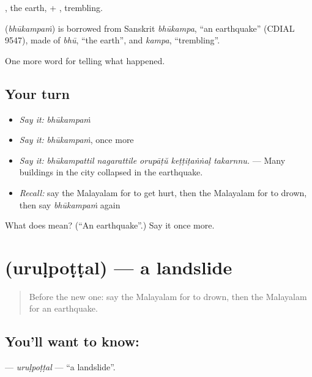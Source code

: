, the earth, + , trembling.

\begin{cousinweb}
\textbf{} (\emph{bhūkampaṁ}) is borrowed from Sanskrit \emph{bhūkampa}, \textquotedblleft{}an earthquake\textquotedblright{} (CDIAL 9547), made of \emph{bhū}, \textquotedblleft{}the earth\textquotedblright{}, and \emph{kampa}, \textquotedblleft{}trembling\textquotedblright{}.
\end{cousinweb}

\begin{grammarlens}[title={What you've built}]
One more word for telling what happened.
\end{grammarlens}

\subsection*{Your turn}
\begin{itemize}
\raggedright
  \item \emph{Say it:} \emph{bhūkampaṁ}
  \item \emph{Say it:} \emph{bhūkampaṁ}, once more
  \item \emph{Say it:} \emph{bhūkampattil nagarattile orupāṭŭ keṭṭiṭaṅṅaḷ takarnnu.} — Many buildings in the city collapsed in the earthquake.
  \item \emph{Recall:} say the Malayalam for to get hurt, then the Malayalam for to drown, then say \emph{bhūkampaṁ} again
\end{itemize}

\begin{tcolorbox}[breakable,colback=teal!4,colframe=teal!35!black,title={Before you move on}]
What does  mean? (\textquotedblleft{}An earthquake\textquotedblright{}.) Say it once more.
\end{tcolorbox}
\section[\texorpdfstring{\ml{ഉരുൾപൊട്ടൽ} (uruḷpoṭṭal)}{ഉരുൾപൊട്ടൽ (uruḷpoṭṭal)}]{ (uruḷpoṭṭal) — a landslide}

\label{lesson:ML-C377-urulpottal}



\begin{quote}
Before the new one: say the Malayalam for to drown, then the Malayalam for an earthquake.
\end{quote}

\subsection*{You'll want to know: }
\textbf{} — \emph{uruḷpoṭṭal} — \textquotedblleft{}a landslide\textquotedblright{}.

